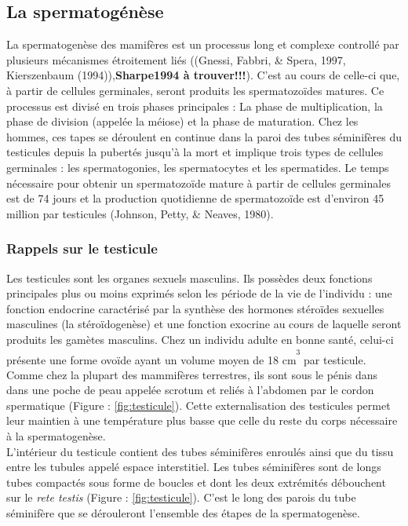 \documentclass[12pt,twoside]{reedthesis}
\theoremstyle{definition}
\theoremstyle{definition}
\theoremstyle{remark}
\begin{document}
  \subsection{La spermatogénèse}\label{la-spermatogenese}
  
  La spermatogenèse des mamifères est un processus long et complexe
  controllé par plusieurs mécanismes étroitement liés ((Gnessi, Fabbri, \&
  Spera, 1997, Kierszenbaum (1994)),\textbf{Sharpe1994 à trouver!!!}).
  C'est au cours de celle-ci que, à partir de cellules germinales, seront
  produits les spermatozoïdes matures. Ce processus est divisé en trois
  phases principales : La phase de multiplication, la phase de division
  (appelée la méiose) et la phase de maturation. Chez les hommes, ces
  tapes se déroulent en continue dans la paroi des tubes séminifères du
  testicules depuis la pubertés jusqu'à la mort et implique trois types de
  cellules germinales : les spermatogonies, les spermatocytes et les
  spermatides. Le temps nécessaire pour obtenir un spermatozoïde mature à
  partir de cellules germinales est de 74 jours et la production
  quotidienne de spermatozoïde est d'environ 45 million par testicules
  (Johnson, Petty, \& Neaves, 1980).
  
  \subsubsection{Rappels sur le testicule}\label{rappels-sur-le-testicule}
  
  Les testicules sont les organes sexuels masculins. Ils possèdes deux
  fonctions principales plus ou moins exprimés selon les période de la vie
  de l'individu : une fonction endocrine caractérisé par la synthèse des
  hormones stéroïdes sexuelles masculines (la stéroïdogenèse) et une
  fonction exocrine au cours de laquelle seront produits les gamètes
  masculins. Chez un individu adulte en bonne santé, celui-ci présente une
  forme ovoïde ayant un volume moyen de 18
  cm\textsuperscript{\textsuperscript{3}} par testicule. Comme chez la
  plupart des mammifères terrestres, ils sont sous le pénis dans dans une
  poche de peau appelée scrotum et reliés à l'abdomen par le cordon
  spermatique (Figure : \ref{fig:testicule}). Cette externalisation des
  testicules permet leur maintien à une température plus basse que celle
  du reste du corps nécessaire à la spermatogenèse.\\
  L'intérieur du testicule contient des tubes séminifères enroulés ainsi
  que du tissu entre les tubules appelé espace interstitiel. Les tubes
  séminifères sont de longs tubes compactés sous forme de boucles et dont
  les deux extrémités débouchent sur le \emph{rete testis} (Figure :
  \ref{fig:testicule}). C'est le long des parois du tube séminifère que se
  dérouleront l'ensemble des étapes de la spermatogenèse.
  
\end{document}
